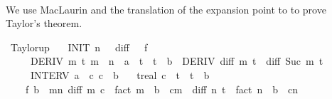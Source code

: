 \begin{isabellebody}
\ \ \ \ \isamarkupfalse%
\isanewline
{}\isamarkupfalse%
%
\endisatagproof
{\isafoldproof}%
%
\isadelimproof
%
\endisadelimproof
%
\isadelimdocument
%
\endisadelimdocument
%
\isatagdocument
%
\isamarkuptrue%
%
\endisatagdocument
{\isafolddocument}%
%
\isadelimdocument
%
\endisadelimdocument
%
\begin{isamarkuptext}%
We use MacLaurin and the translation of the expansion point  to 
  to prove Taylor's theorem.%
\end{isamarkuptext}\isamarkuptrue%
\isamarkupfalse%
\ Taylor{\isacharunderscore}{\kern0pt}up{\isacharcolon}{\kern0pt}\isanewline
\ \ \ INIT{\isacharcolon}{\kern0pt}\ {\isachardoublequoteopen}n\ {\isachargreater}{\kern0pt}\ {}{\isachardoublequoteclose}\ {\isachardoublequoteopen}diff\ {}\ {\isacharequal}{\kern0pt}\ f{\isachardoublequoteclose}\isanewline
\ \ \ \ \ DERIV{\isacharcolon}{\kern0pt}\ {\isachardoublequoteopen}{\isasymforall}m\ t{\isachardot}{\kern0pt}\ m\ {\isacharless}{\kern0pt}\ n\ {\isasymand}\ a\ {\isasymle}\ t\ {\isasymand}\ t\ {\isasymle}\ b\ {\isasymlongrightarrow}\ DERIV\ {\isacharparenleft}{\kern0pt}diff\ m{\isacharparenright}{\kern0pt}\ t\ {\isacharcolon}{\kern0pt}{\isachargreater}{\kern0pt}\ {\isacharparenleft}{\kern0pt}diff\ {\isacharparenleft}{\kern0pt}Suc\ m{\isacharparenright}{\kern0pt}\ t{\isacharparenright}{\kern0pt}{\isachardoublequoteclose}\isanewline
\ \ \ \ \ INTERV{\isacharcolon}{\kern0pt}\ {\isachardoublequoteopen}a\ {\isasymle}\ c{\isachardoublequoteclose}\ {\isachardoublequoteopen}c\ {\isacharless}{\kern0pt}\ b{\isachardoublequoteclose}\isanewline
\ \ \ {\isachardoublequoteopen}{\isasymexists}t{\isacharcolon}{\kern0pt}{\isacharcolon}{\kern0pt}real{\isachardot}{\kern0pt}\ c\ {\isacharless}{\kern0pt}\ t\ {\isasymand}\ t\ {\isacharless}{\kern0pt}\ b\ {\isasymand}\isanewline
\ \ \ \ f\ b\ {\isacharequal}{\kern0pt}\ {\isacharparenleft}{\kern0pt}{\isasymSum}m{\isacharless}{\kern0pt}n{\isachardot}{\kern0pt}\ {\isacharparenleft}{\kern0pt}diff\ m\ c\ {\isacharslash}{\kern0pt}\ fact\ m{\isacharparenright}{\kern0pt}\ {\isacharasterisk}{\kern0pt}\ {\isacharparenleft}{\kern0pt}b\ {\isacharminus}{\kern0pt}\ c{\isacharparenright}{\kern0pt}{\isacharcircum}{\kern0pt}m{\isacharparenright}{\kern0pt}\ {\isacharplus}{\kern0pt}\ {\isacharparenleft}{\kern0pt}diff\ n\ t\ {\isacharslash}{\kern0pt}\ fact\ n{\isacharparenright}{\kern0pt}\ {\isacharasterisk}{\kern0pt}\ {\isacharparenleft}{\kern0pt}b\ {\isacharminus}{\kern0pt}\ c{\isacharparenright}{\kern0pt}{\isacharcircum}{\kern0pt}n{\isachardoublequoteclose}\isanewline

\end{isabellebody}
